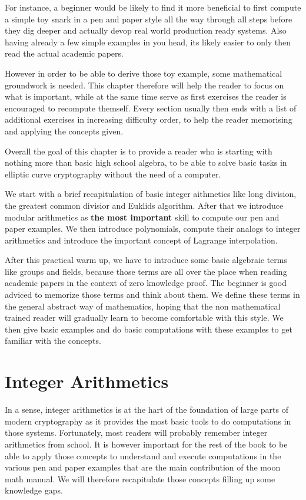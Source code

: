 For instance, a beginner would be likely to find it more beneficial to first compute a simple toy snark in a pen and paper style all the way through all steps before they dig deeper and actually devop real world production ready systems. Also having already a few simple examples in you head, its likely easier to only then read the actual academic papers. 

However in order to be able to derive those toy example, some mathematical groundwork is needed. This chapter therefore will help the reader to focus on what is important, while at the same time serve as first exercises the reader is encouraged to recompute themself. Every section usually then ends with a list of additional exercises in increasing difficulty order, to help the reader memorising and applying the concepts given. 

Overall the goal of this chapter is to provide a reader who is starting with nothing more than basic high school algebra, to be able to solve basic tasks in elliptic curve cryptography without the need of a computer.


We start with a brief recapitulation of basic integer aithmetics like long division, the greatest common divisior and Euklids algorithm. After that we introduce modular arithmetics as \textbf{the most important} skill to compute our pen and paper examples. We then introduce polynomials, compute their analogs to integer arithmetics and introduce the important concept of Lagrange interpolation.

After this practical warm up, we have to introduce some basic algebraic terms like groups and fields, because those terms are all over the place when reading academic papers in the context of zero knowledge proof. The beginner is good adviced to memorize those terms and think about them. We define these terms in the general abstract way of mathematics, hoping that the non mathematical trained reader will gradually learn to become comfortable with this style. We then give basic examples and do basic computations with these examples to get familiar with the concepts. 

\section{Integer Arithmetics}
\label{integer_arithmetics}
In a sense, integer arithmetics is at the hart of the foundation of large parts of modern cryptography as it provides the most basic tools to do computations in those systems. Fortunately, most readers will probably remember integer arithmetics from school. It is however important for the rest of the book to be able to apply those concepts to understand and execute computations in the various pen and paper examples that are the main contribution of the moon math manual. We will therefore recapitulate those concepts filling up some knowledge gaps.

